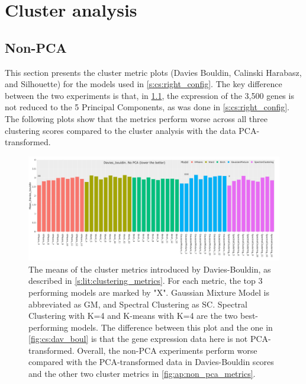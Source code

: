 \chapter{Cluster analysis} \label{s:ap:cs}

\newpage 

\section{Non-PCA} \label{s:ap:non-pca}

This section presents the cluster metric plots (Davies Bouldin, Calinski Harabasz, and Silhouette) for the models used in \cref{s:cs:right_config}. The key difference between the two experiments is that, in \cref{s:ap:non-pca}, the expression of the 3,500 genes is not reduced to the 5 Principal Components, as was done in \cref{s:cs:right_config}. The following plots show that the metrics perform worse across all three clustering scores compared to the cluster analysis with the data PCA-transformed.


\begin{figure}[!htb]    
    \centering
    \includegraphics[width=1.0\textwidth,keepaspectratio]{Sections/ClusteringAnalysis/Resources/cs_top3/non_PCA_top3_Davies_bouldin.png}
    \caption[Non-PCA transformed data: Davies Bouldin]{The means of the cluster metrics introduced by Davies-Bouldin, as described in \cref{s:lit:clustering_metrics}. For each metric, the top 3 performing models are marked by "X". Gaussian Mixture Model is abbreviated as GM, and Spectral Clustering as SC. Spectral Clustering with K=4 and K-means with K=4 are the two best-performing models. The difference between this plot and the one in \cref{fig:cs:dav_boul} is that the gene expression data here is not PCA-transformed. Overall, the non-PCA experiments perform worse compared with the PCA-transformed data in Davies-Bouldin scores and the other two cluster metrics in \cref{fig:ap:non_pca_metrics}.}
    \label{fig:ap:non_pca_dav_boul}
\end{figure}



